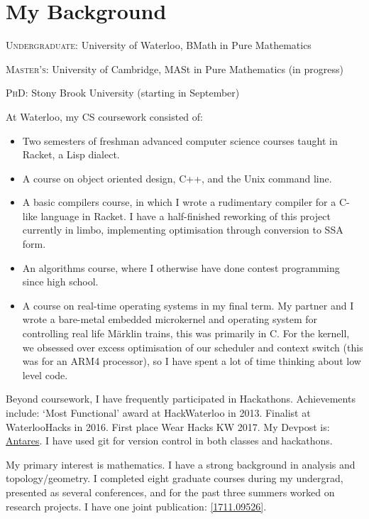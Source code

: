 \documentclass[12pt]{amsart}
\newlength\mystoreparindent
\newenvironment{myparindent}[1]{%
\setlength{\mystoreparindent}{\the\parindent}
\setlength{\parindent}{#1}
}{%
\setlength{\parindent}{\mystoreparindent}
}
\begin{document}
\clearpage

\section*{My Background}

\begin{myparindent}{0pt}

\textsc{Undergraduate}: University of Waterloo, BMath in Pure Mathematics

\textsc{Master's}: University of Cambridge, MASt in Pure Mathematics (in progress)

\textsc{PhD}: Stony Brook University (starting in September)

\end{myparindent}

At Waterloo, my CS coursework consisted of:
\begin{itemize}
    \item Two semesters of freshman advanced computer science courses taught in Racket, a Lisp dialect.
    \item A course on object oriented design, C++, and the Unix command line.
    \item A basic compilers course, in which I wrote a rudimentary compiler for a C-like language in Racket. I have a half-finished reworking of this project currently in limbo, implementing optimisation through conversion to SSA form.
    \item An algorithms course, where I otherwise have done contest programming since high school.
    \item A course on real-time operating systems in my final term. My partner and I wrote a bare-metal embedded microkernel and operating system for controlling real life Märklin trains, this was primarily in C. For the kernell, we obsessed over excess optimisation of our scheduler and context switch (this was for an ARM4 processor), so I have spent a lot of time thinking about low level code.
\end{itemize}

Beyond coursework, I have frequently participated in Hackathons. Achievements include: `Most Functional' award at HackWaterloo in 2013. Finalist at WaterlooHacks in 2016. First place Wear Hacks KW 2017. My Devpost is: \href{https://devpost.com/Antares}{Antares}. I have used git for version control in both classes and hackathons.

My primary interest is mathematics. I have a strong background in analysis and topology/geometry. I completed eight graduate courses during my undergrad, presented as several conferences, and for the past three summers worked on research projects. I have one joint publication: \href{https://arxiv.org/abs/1711.09526}{[1711.09526]}.
\end{document}
